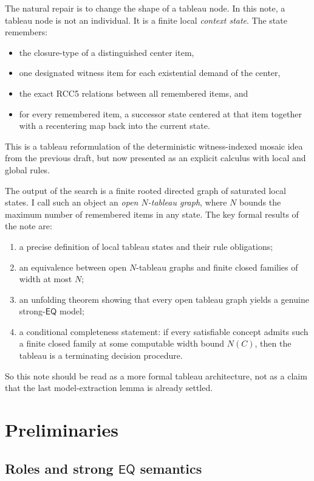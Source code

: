 \documentclass[11pt]{article}
\theoremstyle{definition}
\newcommand{\Eq}{\mathsf{EQ}}
\begin{document}
The natural repair is to change the shape of a tableau node. In this note, a tableau node is not an individual. It is a finite local \emph{context state}. The state remembers:
\begin{itemize}
    \item the closure-type of a distinguished center item,
    \item one designated witness item for each existential demand of the center,
    \item the exact RCC5 relations between all remembered items, and
    \item for every remembered item, a successor state centered at that item together with a recentering map back into the current state.
\end{itemize}

This is a tableau reformulation of the deterministic witness-indexed mosaic idea from the previous draft, but now presented as an explicit calculus with local and global rules.

The output of the search is a finite rooted directed graph of saturated local states. I call such an object an \emph{open $N$-tableau graph}, where $N$ bounds the maximum number of remembered items in any state. The key formal results of the note are:
\begin{enumerate}
    \item a precise definition of local tableau states and their rule obligations;
    \item an equivalence between open $N$-tableau graphs and finite closed families of width at most $N$;
    \item an unfolding theorem showing that every open tableau graph yields a genuine strong-$\Eq$ model;
    \item a conditional completeness statement: if every satisfiable concept admits such a finite closed family at some computable width bound $N(C)$, then the tableau is a terminating decision procedure.
\end{enumerate}

So this note should be read as a more formal tableau architecture, not as a claim that the last model-extraction lemma is already settled.

\section{Preliminaries}

\subsection{Roles and strong $\Eq$ semantics}
\end{document}

